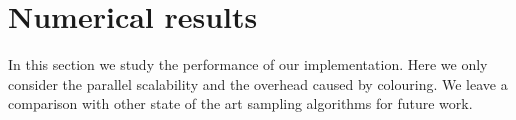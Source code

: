 \documentclass[
fontsize=11pt,
paper=a4,
numbers=noenddot
]{scrartcl}
\begin{document}



\section{Numerical results}\label{sec:numerics}
In this section we study the performance of our implementation. Here we only consider the parallel scalability and the overhead caused by colouring. We leave a comparison with other state of the art sampling algorithms for future work.
\end{document}
